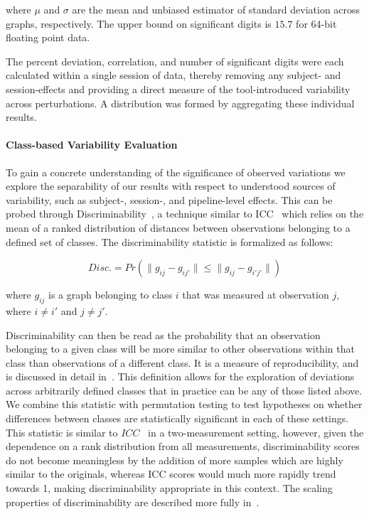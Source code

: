 \documentclass[fleqn,10pt]{SelfArx} %
\newcommand{\new}[1]{{#1}}
\begin{document}
where $\mu$ and $\sigma$ are the mean and unbiased estimator of standard deviation across graphs, respectively. The
upper bound on significant digits is $15.7$ for 64-bit floating point data.

The percent deviation, correlation, and number of significant digits were each calculated within a single session of
data, thereby removing any subject- and session-effects and providing a direct measure of the tool-introduced
variability across perturbations. A distribution was formed by aggregating these individual results.

\paragraph{Class-based Variability Evaluation} To gain a concrete understanding of the significance of observed
variations we explore the separability of our results with respect to understood sources of variability, such as 
subject-, session-, and pipeline-level effects. This can be probed through Discriminability~\cite{bridgeford2020elim},
a technique similar to ICC~\cite{Bartko1966-tl} which relies on the mean of a ranked distribution of distances between
observations belonging to a defined set of classes. The discriminability statistic is formalized as follows:

\begin{equation}
Disc. = Pr(\lVert g_{ij} - g_{ij'} \rVert \leq \lVert g_{ij} - g_{i'j'} \rVert)
\label{eq:sigdig}
\end{equation}

where $g_{ij}$ is a graph belonging to class $i$ that was measured at observation $j$, where $i \neq i'$ and
$j \neq j'$.

Discriminability can then be read as the probability that an observation belonging to a given class will be more
similar to other observations within that class than observations of a different class. It is a measure of
reproducibility, and is discussed in detail in~\cite{bridgeford2020elim}. This definition allows for the exploration of
deviations across arbitrarily defined classes that in practice can be any of those listed above. We combine this
statistic with permutation testing to test hypotheses on whether differences between classes are statistically
significant in each of these settings. \new{This statistic is similar to $ICC$~\cite{Bartko1966-tl} in a two-measurement
setting, however, given the dependence on a rank distribution from all measurements, discriminability scores do not
become meaningless by the addition of more samples which are highly similar to the originals, whereas ICC scores would
much more rapidly trend towards 1, making discriminability appropriate in this context.} The scaling properties of 
discriminability are described more fully in~.
\end{document}
